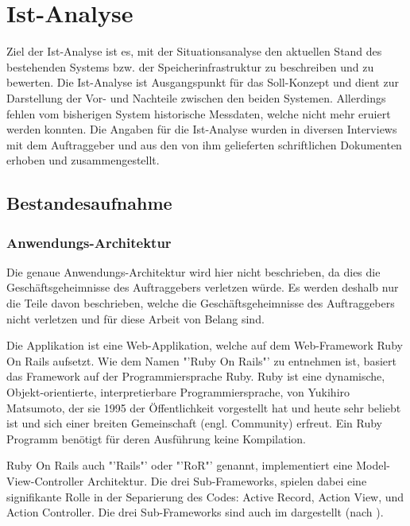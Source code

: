 
\cleardoublepage
\chapter{Ist-Analyse}
Ziel der Ist-Analyse ist es, mit der Situationsanalyse den aktuellen Stand des bestehenden Systems bzw. der Speicherinfrastruktur zu beschreiben und zu bewerten. Die Ist-Analyse ist Ausgangspunkt für das Soll-Konzept und dient zur Darstellung der Vor- und Nachteile zwischen den beiden Systemen. Allerdings fehlen vom bisherigen System historische Messdaten, welche nicht mehr eruiert werden konnten.
Die Angaben für die Ist-Analyse wurden in diversen Interviews mit dem Auftraggeber und aus den von ihm gelieferten schriftlichen Dokumenten erhoben und zusammengestellt. 

\section{Bestandesaufnahme}
\subsection{Anwendungs-Architektur}
Die genaue Anwendungs-Architektur wird hier nicht beschrieben, da dies die Geschäftsgeheimnisse des Auftraggebers verletzen würde. Es werden deshalb nur die Teile davon beschrieben, welche die Geschäftsgeheimnisse des Auftraggebers nicht verletzen und für diese Arbeit von Belang sind.

Die Applikation ist eine Web-Applikation, welche auf dem Web-Framework Ruby On Rails aufsetzt.
Wie dem Namen "'Ruby On Rails"' zu entnehmen ist, basiert das Framework auf der Programmiersprache Ruby. Ruby ist eine dynamische, Objekt-orientierte, interpretierbare Programmiersprache, von Yukihiro Matsumoto, der sie 1995 der Öffentlichkeit vorgestellt hat und heute sehr beliebt ist und sich einer breiten Gemeinschaft (engl. Community) erfreut. Ein Ruby Programm benötigt für deren Ausführung keine Kompilation.

Ruby On Rails auch "'Rails"' oder "'RoR"' genannt, implementiert eine Model-View-Controller Architektur. Die drei Sub-Frameworks, spielen dabei eine signifikante Rolle in der Separierung des Codes: Active Record, Action View, und Action Controller. Die drei Sub-Frameworks sind auch im  dargestellt (nach \cite{Bachle2007}).

